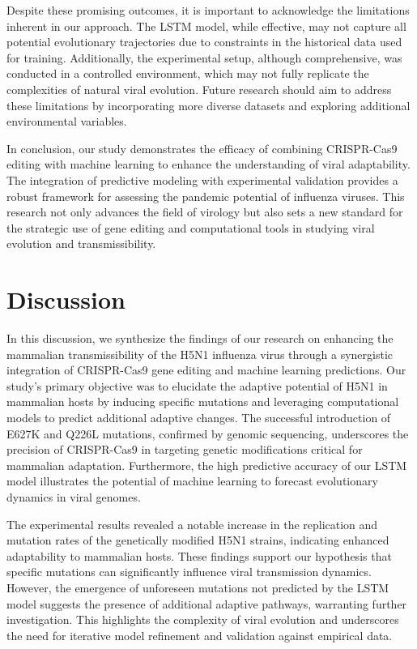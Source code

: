 \documentclass{article}
\begin{document}
Despite these promising outcomes, it is important to acknowledge the limitations inherent in our approach. The LSTM model, while effective, may not capture all potential evolutionary trajectories due to constraints in the historical data used for training. Additionally, the experimental setup, although comprehensive, was conducted in a controlled environment, which may not fully replicate the complexities of natural viral evolution. Future research should aim to address these limitations by incorporating more diverse datasets and exploring additional environmental variables.

In conclusion, our study demonstrates the efficacy of combining CRISPR-Cas9 editing with machine learning to enhance the understanding of viral adaptability. The integration of predictive modeling with experimental validation provides a robust framework for assessing the pandemic potential of influenza viruses. This research not only advances the field of virology but also sets a new standard for the strategic use of gene editing and computational tools in studying viral evolution and transmissibility.

\section{Discussion}
In this discussion, we synthesize the findings of our research on enhancing the mammalian transmissibility of the H5N1 influenza virus through a synergistic integration of CRISPR-Cas9 gene editing and machine learning predictions. Our study's primary objective was to elucidate the adaptive potential of H5N1 in mammalian hosts by inducing specific mutations and leveraging computational models to predict additional adaptive changes. The successful introduction of E627K and Q226L mutations, confirmed by genomic sequencing, underscores the precision of CRISPR-Cas9 in targeting genetic modifications critical for mammalian adaptation. Furthermore, the high predictive accuracy of our LSTM model illustrates the potential of machine learning to forecast evolutionary dynamics in viral genomes.

The experimental results revealed a notable increase in the replication and mutation rates of the genetically modified H5N1 strains, indicating enhanced adaptability to mammalian hosts. These findings support our hypothesis that specific mutations can significantly influence viral transmission dynamics. However, the emergence of unforeseen mutations not predicted by the LSTM model suggests the presence of additional adaptive pathways, warranting further investigation. This highlights the complexity of viral evolution and underscores the need for iterative model refinement and validation against empirical data.
\end{document}

